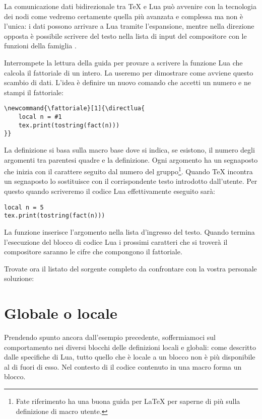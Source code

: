 La comunicazione dati bidirezionale tra \TeX{} e Lua può avvenire con la
tecnologia dei nodi come vedremo certamente quella più avanzata e complessa ma
non è l'unica: i dati possono arrivare a Lua tramite l'espansione, mentre nella
direzione opposta è possibile scrivere del testo nella lista di input del
compositore con le funzioni della famiglia .

Interrompete la lettura della guida per provare a scrivere la funzione Lua
 che calcola il fattoriale di un intero. La useremo per dimostrare come
avviene questo scambio di dati. L'idea è definire un nuovo comando che accetti
un numero e ne stampi il fattoriale:
\begin{Verbatim}
\newcommand{\fattoriale}[1]{\directlua{
    local n = #1
    tex.print(tostring(fact(n)))
}}
\end{Verbatim}

La definizione si basa sulla macro base  dove si indica, se
esistono, il numero degli argomenti tra parentesi quadre e la definizione. Ogni
argomento ha un segnaposto che inizia con il carattere \code{\#} seguito dal
numero del gruppo\footnote{Fate riferimento ha una buona guida per \LaTeX{} per
saperne di più sulla definizione di macro utente.}. Quando \TeX{} incontra un
segnaposto lo sostituisce con il corrispondente testo introdotto dall'utente.
Per questo quando scriveremo  il codice Lua
effettivamente eseguito sarà:
\begin{Verbatim}
local n = 5
tex.print(tostring(fact(n)))
\end{Verbatim}

La funzione  inserisce l'argomento nella lista d'ingresso del
testo. Quando termina l'esecuzione del blocco di codice Lua i prossimi caratteri
che si troverà il compositore saranno le cifre che compongono il fattoriale.

Trovate ora il listato del sorgente completo da confrontare con la vostra
personale soluzione:


\section{Globale o locale}

Prendendo spunto ancora dall'esempio precedente, soffermiamoci sul comportamento
nei diversi blocchi  delle definizioni locali e globali: come
descritto dalle specifiche di Lua, tutto quello che è locale a un blocco non è
più disponibile al di fuori di esso. Nel contesto di \LuaTeX{} il codice
contenuto in una macro  forma un blocco.

